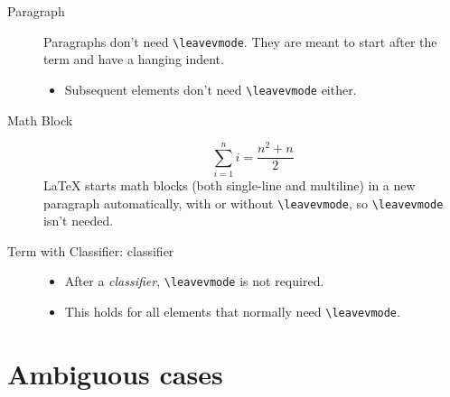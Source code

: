 \documentclass[a4paper]{article}
\begin{document}
\begin{description}
\item[{Paragraph}] 
Paragraphs don’t need \texttt{\textbackslash{}leavevmode}.  They are meant
to start after the term and have a hanging indent.

\begin{itemize}
\item Subsequent elements don’t need \texttt{\textbackslash{}leavevmode} either.
\end{itemize}

\item[{Math Block}] %
\begin{equation*}
\sum_{i=1}^n i = \frac{n^2+n}{2}
\end{equation*}
LaTeX starts math blocks (both single-line and multiline) in a new
paragraph automatically, with or without \texttt{\textbackslash{}leavevmode}, so
\texttt{\textbackslash{}leavevmode} isn’t needed.

\item[{Term with Classifier: classifier}] \leavevmode
\begin{itemize}
\item After a \emph{classifier}, \texttt{\textbackslash{}leavevmode} is not required.

\item This holds for all elements that normally need \texttt{\textbackslash{}leavevmode}.
\end{itemize}
\end{description}


\section{Ambiguous cases%
  \label{ambiguous-cases}%
}
\end{document}
